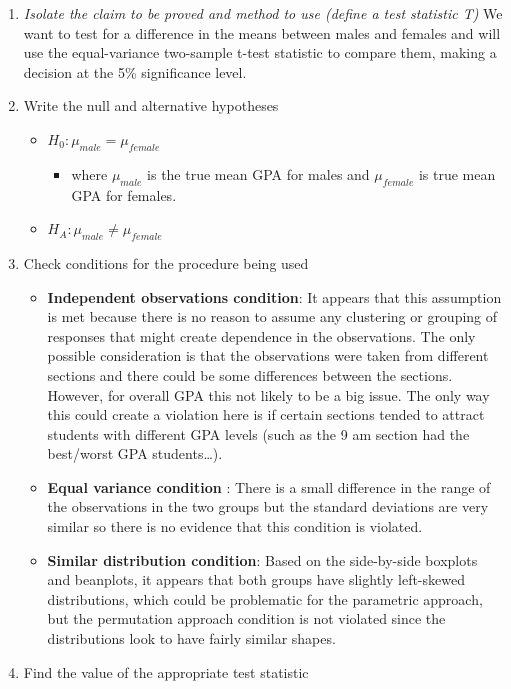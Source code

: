 \documentclass[]{book}
\providecommand{\tightlist}{%
  \setlength{\itemsep}{0pt}\setlength{\parskip}{0pt}}
\begin{document}
\begin{enumerate}
\def\labelenumi{\arabic{enumi}.}
\setcounter{enumi}{-1}
\item
  \emph{Isolate the claim to be proved and method to use (define a test
  statistic T)} We want to test for a difference in the means between
  males and females and will use the equal-variance two-sample t-test
  statistic to compare them, making a decision at the 5\% significance
  level.
\item
  Write the null and alternative hypotheses

  \begin{itemize}
  \item
    \(H_0: \mu_{male} = \mu_{female}\)

    \begin{itemize}
    \tightlist
    \item
      where \(\mu_{male}\) is the true mean GPA for males and
      \(\mu_{female}\) is true mean GPA for females.
    \end{itemize}
  \item
    \(H_A: \mu_{male} \ne \mu_{female}\)
  \end{itemize}
\item
  Check conditions for the procedure being used

  \begin{itemize}
  \item
    \textbf{Independent observations condition}: It appears that this
    assumption is met because there is no reason to assume any
    clustering or grouping of responses that might create dependence in
    the observations. The only possible consideration is that the
    observations were taken from different sections and there could be
    some differences between the sections. However, for overall GPA this
    not likely to be a big issue. The only way this could create a
    violation here is if certain sections tended to attract students
    with different GPA levels (such as the 9 am section had the
    best/worst GPA students\ldots{}).
  \item
    \textbf{Equal variance condition} : There is a small difference in
    the range of the observations in the two groups but the standard
    deviations are very similar so there is no evidence that this
    condition is violated.
  \item
    \textbf{Similar distribution condition}: Based on the side-by-side
    boxplots and beanplots, it appears that both groups have slightly
    left-skewed distributions, which could be problematic for the
    parametric approach, but the permutation approach condition is not
    violated since the distributions look to have fairly similar shapes.
  \end{itemize}
\item
  Find the value of the appropriate test statistic


\end{enumerate}
\end{document}
